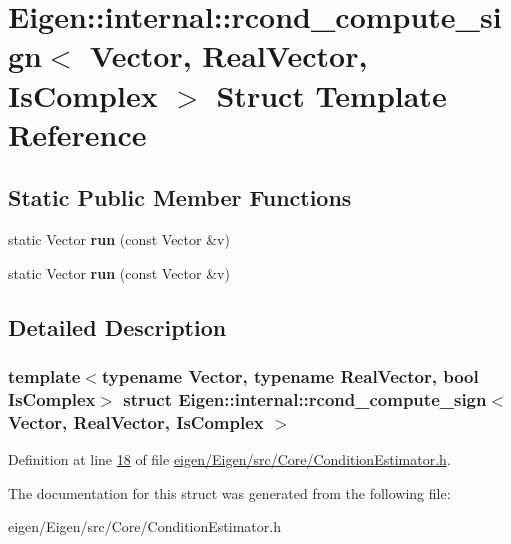 \hypertarget{struct_eigen_1_1internal_1_1rcond__compute__sign}{}\section{Eigen\+:\+:internal\+:\+:rcond\+\_\+compute\+\_\+sign$<$ Vector, Real\+Vector, Is\+Complex $>$ Struct Template Reference}
\label{struct_eigen_1_1internal_1_1rcond__compute__sign}
\subsection*{Static Public Member Functions}
\begin{DoxyCompactItemize}
\item 
\mbox{\label{struct_eigen_1_1internal_1_1rcond__compute__sign_a0c1e067cca0d2d9884c310fb86388361}} 
static Vector {\bfseries run} (const Vector \&v)
\item 
\mbox{\label{struct_eigen_1_1internal_1_1rcond__compute__sign_a0c1e067cca0d2d9884c310fb86388361}} 
static Vector {\bfseries run} (const Vector \&v)
\end{DoxyCompactItemize}


\subsection{Detailed Description}
\subsubsection*{template$<$typename Vector, typename Real\+Vector, bool Is\+Complex$>$\newline
struct Eigen\+::internal\+::rcond\+\_\+compute\+\_\+sign$<$ Vector, Real\+Vector, Is\+Complex $>$}



Definition at line \hyperlink{eigen_2_eigen_2src_2_core_2_condition_estimator_8h_source_l00018}{18} of file \hyperlink{eigen_2_eigen_2src_2_core_2_condition_estimator_8h_source}{eigen/\+Eigen/src/\+Core/\+Condition\+Estimator.\+h}.



The documentation for this struct was generated from the following file\+:\begin{DoxyCompactItemize}
\item 
eigen/\+Eigen/src/\+Core/\+Condition\+Estimator.\+h\end{DoxyCompactItemize}
